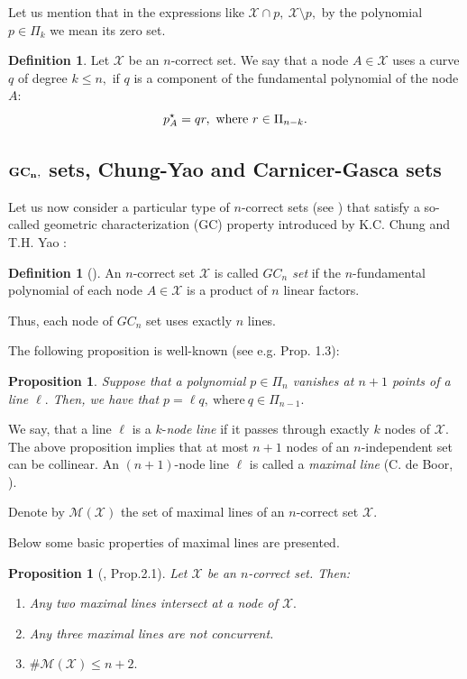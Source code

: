 \documentclass[a4paper,12pt]{article}
\newtheorem{proposition}[lemma]{Proposition}
\theoremstyle{definition}
\newtheorem{definition}[lemma]{Definition}
\numberwithin{equation}{section}
\numberwithin{figure}{section}
\newcommand{\Mset}{\mathcal{M}}
\newcommand{\Xset}{\mathcal{X}}
\begin{document}
Let us mention that in the expressions like ${\mathcal X \cap p},\ \Xset\setminus p,$ by the polynomial $p\in\Pi_k$ we mean its zero set. 
\begin{definition} Let $\Xset$ be an $n$-correct set.
We say that a node $A\in\Xset$ uses a curve $q$ of degree $k\le n,$ if $q$ is a component of the fundamental polynomial of the node $A:$ $$ p^\star_A=q r,\ \hbox{where}\  r\in\Pi_{n-k}.$$
\end{definition}

\subsection{$\bf{GC_n},$ sets, Chung-Yao and Carnicer-Gasca sets}

Let us now consider a particular type of $n$-correct sets (see \cite{HV}) that satisfy a so-called geometric characterization (GC) property introduced by K.C. Chung and T.H. Yao \cite{CY77}:
\begin{definition}[\cite{CY77}]
An $n$-correct set ${\mathcal X}$ is called \emph{$GC_n$ set }
 if  the
$n$-fundamental polynomial of each node $A\in{\mathcal X}$ is a
product of $n$  linear factors.
\end{definition}
Thus, each node of $GC_n$ set uses exactly $n$ lines.

The following proposition is well-known (see e.g. \cite{HJZ09b}
Prop. 1.3):
\begin{proposition}\label{prp:n+1ell}
Suppose that a polynomial $p \in
\Pi_n$ vanishes at $n+1$ points of a line $\ell.$ Then, we have that
$
p = \ell  q  ,\ \text{where} \ q\in\Pi_{n-1}.
$
\end{proposition}
We say, that a line $\ell$ is a $k$-\emph{node line} if it passes through exactly $k$ nodes of $\Xset.$
The above proposition implies that at most $n+1$ nodes of an $n$-independent set  can be collinear. An $(n+1)$-node line $\ell$ is called a \emph{maximal line} (C. de Boor, \cite{dB07}).

Denote by $\Mset(\Xset)$ the set of maximal lines of an $n$-correct set $\Xset.$



Below some basic properties of maximal lines are presented.

\begin{proposition}[\cite{CG01}, Prop.2.1] \label{hatk} Let $\Xset$ be an $n$-correct set. Then:
\begin{enumerate}
\item
Any two maximal lines intersect at a node of $\Xset.$
\item
Any three maximal lines are not concurrent.
\item
$\#\Mset(\Xset)\le n+2.$
\end{enumerate}
\end{proposition}
\end{document}
